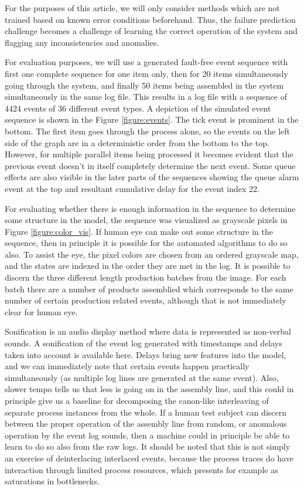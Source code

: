 \documentclass[journal]{IEEEtran}
\begin{document}
For the purposes of this article, we will only consider methods which are not trained based on known error conditions beforehand. Thus, the failure prediction challenge
becomes a challenge of learning the correct operation of the system and flagging any inconsistencies and anomalies.

For evaluation purposes, we will use a generated fault-free event sequence with first one complete sequence for one item only, then for 20 items simultaneously going through the system,
and finally 50 items being assembled in the system simultaneously in the same log file. This results in a log file with a sequence of 4424 events of 36 different
event types. A depiction of the simulated event sequence is shown in the Figure \ref{figure:events}. The tick event is prominent in the bottom.
The first item goes through the process alone, so the events on the left side
of the graph are in a deterministic order from the bottom to the top. However, for multiple parallel items being processed it becomes evident that the previous event doesn't in itself
completely determine the next event.
Some queue effects are also visible in the later parts of the sequences showing the queue alarm event at the top and resultant cumulative delay for the event index 22.

For evaluating whether there is enough information in the sequence to determine some structure in the model, the sequence was visualized as grayscale pixels in Figure \ref{figure:color_vis}.
If human eye can make out some structure in the sequence, then in principle it is possible for the automated algorithms to do so also. To assist the eye, the pixel colors are chosen
from an ordered grayscale map, and the states are indexed in the order they are met in the log. It is possible to discern the three different length production batches from the image.
For each batch there are
a number of products assemblied which corresponds to the same number of certain production related events, although that is not immediately clear for human eye.

Sonification is an audio display method where data is represented as non-verbal sounds. A sonification of the event log generated with timestamps and delays taken into account
is available here\cite{PHONOZATION}. Delays bring new features into the model, and
we can immediately note that certain events happen practically simultaneously (as multiple log lines are generated at the same event). Also, slower tempo tells us that less is
going on in the assembly line, and this could in principle give us a baseline for decomposing the canon-like interleaving of separate process instances from the whole.
If a human test subject can discern between the proper operation of the assembly line from random, or anomalous operation by the event log sounds,
then a machine could in principle be able to learn to do so also from the raw logs. It should be noted that this is not simply an exercise of deinterlacing interlaced events, because
the process traces do have interaction through limited process resources, which presents for example as saturations in bottlenecks.
\end{document}
